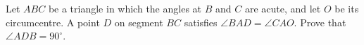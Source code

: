 Let $ABC$ be a triangle in which the angles at $B$ and $C$ are acute, and let $O$ be its circumcentre. A point $D$ on segment $BC$ satisfies $\angle BAD=\angle CAO$. Prove that $\angle ADB=90^\circ$.

